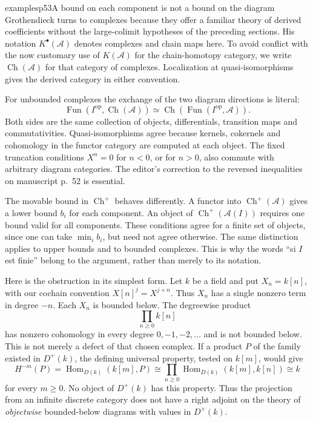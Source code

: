 \begin{dcomment}{examples}{p53}{A bound on each component is not a bound on the diagram}
Grothendieck turns to complexes because they offer a familiar theory of derived coefficients without the large-colimit hypotheses of the preceding sections. His notation $K^\bullet(\mathcal A)$ denotes complexes and chain maps here. To avoid conflict with the now customary use of $K(\mathcal A)$ for the chain-homotopy category, we write $\operatorname{Ch}(\mathcal A)$ for that category of complexes. Localization at quasi-isomorphisms gives the derived category in either convention.

For unbounded complexes the exchange of the two diagram directions is literal:
\[
 \operatorname{Fun}(I^{\mathrm{op}},\operatorname{Ch}(\mathcal A))
 \simeq \operatorname{Ch}(\operatorname{Fun}(I^{\mathrm{op}},\mathcal A)).
\]
Both sides are the same collection of objects, differentials, transition maps and commutativities. Quasi-isomorphisms agree because kernels, cokernels and cohomology in the functor category are computed at each object. The fixed truncation conditions $X^n=0$ for $n<0$, or for $n>0$, also commute with arbitrary diagram categories. The editor's correction to the reversed inequalities on manuscript p.~52 is essential.

The movable bound in $\operatorname{Ch}^+$ behaves differently. A functor into $\operatorname{Ch}^+(\mathcal A)$ gives a lower bound $b_i$ for each component. An object of $\operatorname{Ch}^+(\mathcal A(I))$ requires one bound valid for all components. These conditions agree for a finite set of objects, since one can take $\min_i b_i$, but need not agree otherwise. The same distinction applies to upper bounds and to bounded complexes. This is why the words ``si $I$ est finie'' belong to the argument, rather than merely to its notation.

Here is the obstruction in its simplest form. Let $k$ be a field and put $X_n=k[n]$, with our cochain convention $X[n]^j=X^{j+n}$. Thus $X_n$ has a single nonzero term in degree $-n$. Each $X_n$ is bounded below. The degreewise product
\[
                         \prod_{n\geq0} k[n]
\]
has nonzero cohomology in every degree $0,-1,-2,\ldots$ and is not bounded below. This is not merely a defect of that chosen complex. If a product $P$ of the family existed in $D^+(k)$, the defining universal property, tested on $k[m]$, would give
\[
 H^{-m}(P)=\operatorname{Hom}_{D(k)}(k[m],P)
 \cong\prod_{n\geq0}\operatorname{Hom}_{D(k)}(k[m],k[n])
 \cong k
\]
for every $m\geq0$. No object of $D^+(k)$ has this property. Thus the projection from an infinite discrete category does not have a right adjoint on the theory of \emph{objectwise} bounded-below diagrams with values in $D^+(k)$.


\end{dcomment}
